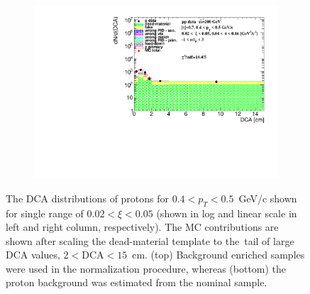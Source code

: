 \begin{figure}[h!]
\begin{subfigure}{.49\textwidth}
	\end{subfigure}
	\begin{subfigure}{.49\textwidth}
		\includegraphics[width=\linewidth, page=4]{chapters/chrgSTAR/img/DCAproton/background_p_0.pdf}
	\end{subfigure}
	\caption{The $\textrm{DCA}$ distributions of protons for $0.4<p_T<0.5$~GeV/c shown for single range of $0.02<\xi<0.05$ (shown in log and linear scale in left and right column, respectively). The MC  contributions are shown after scaling the dead-material template  to the~tail of large $\textrm{DCA}$ values, $2<\textrm{DCA}<15$~cm. (top) Background enriched samples were used in the normalization procedure, whereas (bottom) the proton background was estimated from the nominal sample.}
	\label{fig:bkg_proton}
\end{figure}

